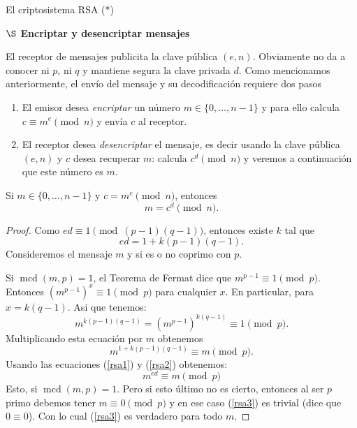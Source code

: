 \begin{section}{El criptosistema RSA (*)}
\begin{observacion}
\end{observacion}



\noindent \textbf{$\S$ Encriptar y desencriptar mensajes}

El receptor de mensajes publicita la clave pública $(e,n)$. Obviamente no da a conocer ni $p$, ni $q$ y mantiene segura la clave privada $d$. Como mencionamos anteriormente, el envío del mensaje y su decodificación requiere dos pasos
\begin{enumerate}[label=(\alph*)]
\item  El  emisor desea \emph{encriptar }un número $m \in \{0,\ldots,n-1\}$ y para ello calcula $c \equiv m^e \pmod{n}$ y  envía $c$ al receptor.
\item  El receptor desea \emph{desencriptar} el mensaje, es decir usando la clave pública $(e,n)$ y $c$ desea recuperar $m$: calcula $c^d \pmod{n}$ y veremos a continuación que este número es $m$. 
\end{enumerate}

\begin{proposicion} \label{rsa}Si $m \in \{0,\ldots,n-1\}$ y $c = m^e \pmod{n}$, entonces $$m= c^d \pmod{n}.$$
\end{proposicion} 
\begin{proof}
Como $ed \equiv 1 \pmod{(p - 1)(q - 1)}$, entonces existe $k$ tal que  
\begin{equation}\label{rsa1}
ed = 1 + k(p - 1)(q - 1).
\end{equation}
Consideremos el mensaje $m$ y si es o no coprimo con $p$.

Si $\operatorname{mcd}(m, p) = 1$, el Teorema de Fermat dice que $m^{p - 1}  \equiv 1\pmod{p}$.
Entonces $(m^{p - 1})^x \equiv 1\pmod{p}$ para cualquier $x$. En particular, para 
$x = k(q-1)$. Asi que tenemos:
\begin{equation*}
m^{k(p-1)(q-1)} = (m^{p-1})^{k(q-1)} \equiv 1\pmod{p}.
\end{equation*}
Multiplicando esta ecuación por $m$ obtenemos
\begin{equation}\label{rsa2}
m^{1+k(p-1)(q-1)} \equiv m\pmod{p}. 
\end{equation}
Usando las ecuaciones (\ref{rsa1}) y (\ref{rsa2}) obtenemos:
\begin{equation}\label{rsa3}
m^{ed} \equiv m\pmod{p} 
\end{equation}
Esto, si  $\operatorname{mcd}(m, p) = 1$. Pero si esto último no es cierto, entonces al ser $p$
primo debemos tener $m \equiv 0\pmod{p}$ y en ese caso (\ref{rsa3}) es trivial (dice que $0 \equiv 0$).
Con lo cual (\ref{rsa3}) es verdadero para todo $m$.


\end{proof}
\end{section}
